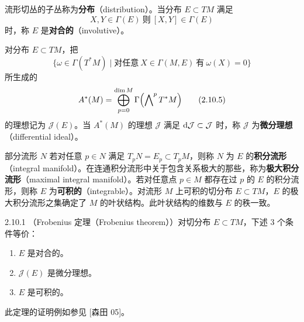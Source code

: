 

流形切丛的子丛称为\textbf{分布}（distribution）。当分布 $E\subset TM$ 满足
\begin{equation}
  X,Y\in\Gamma(E)\ \text{则}\ [X,Y]\in\Gamma(E)
  \tag{2.10.3}
\end{equation}
时，称 $E$ 是\textbf{对合的}（involutive）。

对分布 $E\subset TM$，把
\begin{equation}
  \{\omega\in\Gamma(T^*M)\mid \text{对任意}\ X\in\Gamma(M,E)\ \text{有}\ \omega(X)=0\}
  \tag{2.10.4}
\end{equation}
所生成的
\begin{equation}
  A^*(M) = \bigoplus_{p=0}^{\dim M}\Gamma\Bigl(\bigwedge\nolimits^{p}T^*M\Bigr)
  \tag{2.10.5}
\end{equation}
的理想记为 $\mathcal{J}(E)$。当 $A^*(M)$ 的理想 $\mathcal{J}$ 满足 $\mathrm{d}\mathcal{J}\subset\mathcal{J}$ 时，称 $\mathcal{J}$ 为\textbf{微分理想}（differential ideal）。


部分流形 $N$ 若对任意 $p\in N$ 满足 $T_pN=E_p\subset T_pM$，则称 $N$ 为 $E$ 的\textbf{积分流形}（integral manifold）。在连通积分流形中关于包含关系极大的那些，称为\textbf{极大积分流形}（maximal integral manifold）。若对任意点 $p\in M$ 都存在过 $p$ 的 $E$ 的积分流形，则称 $E$ 为\textbf{可积的}（integrable）。对流形 $M$ 上可积的切分布 $E\subset TM$，$E$ 的极大积分流形之集确定了 $M$ 的叶状结构。此叶状结构的维数与 $E$ 的秩一致。

\begin{theorem}{2.10.1}
（Frobenius 定理（Frobenius theorem））对切分布 $E\subset TM$，下述 3 个条件等价：
\begin{enumerate}[label=\arabic*.,leftmargin=2em]
  \item $E$ 是对合的。
  \item $\mathcal{J}(E)$ 是微分理想。
  \item $E$ 是可积的。
\end{enumerate}
\end{theorem}

此定理的证明例如参见 [森田 05]。

